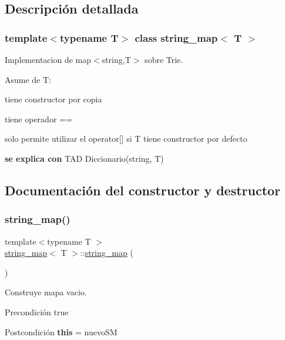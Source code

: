 \subsection{Descripción detallada}
\subsubsection*{template$<$typename T$>$\newline
class string\+\_\+map$<$ T $>$}

Implementacion de map$<$string,\+T$>$ sobre Trie. 

Asume de T\+:
\begin{DoxyItemize}
\item tiene constructor por copia
\item tiene operador ==
\item solo permite utilizar el operator\mbox{[}\mbox{]} si T tiene constructor por defecto
\end{DoxyItemize}

{\bfseries se explica con} T\+AD Diccionario(string, T) 

\subsection{Documentación del constructor y destructor}
\mbox{\label{classstring__map_acd7803d493b09db56e2e9022e526def7}} 
\subsubsection{\texorpdfstring{string\+\_\+map()}{string\_map()}\hspace{0.1cm}{\footnotesize\ttfamily [1/2]}}
{\footnotesize\ttfamily template$<$typename T $>$ \\
\mbox{\hyperlink{classstring__map}{string\+\_\+map}}$<$ T $>$\+::\mbox{\hyperlink{classstring__map}{string\+\_\+map}} (\begin{DoxyParamCaption}{ }\end{DoxyParamCaption})}



Construye mapa vacio. 

\begin{DoxyPrecond}{Precondición}
true 
\end{DoxyPrecond}
\begin{DoxyPostcond}{Postcondición}
{\bfseries this} = nuevo\+SM
\end{DoxyPostcond}

